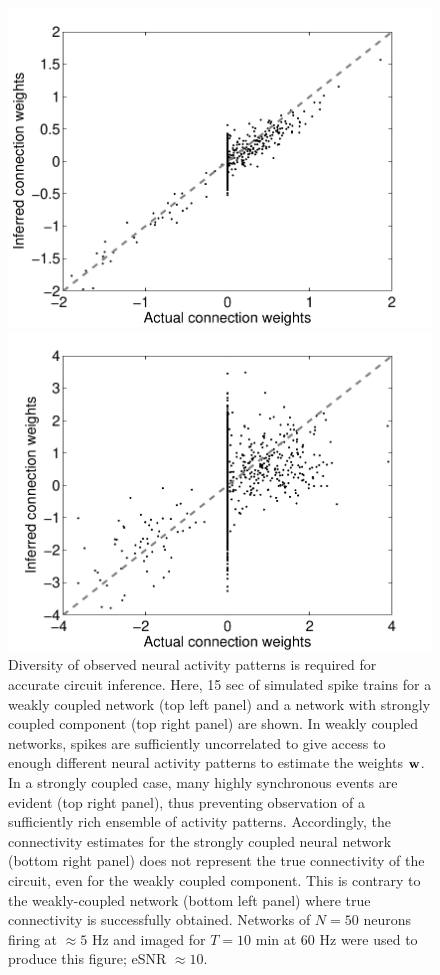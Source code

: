 \documentclass[aoas,preprint]{imsart}
\begin{document}
\begin{figure}[t!]
\begin{minipage}[c]{0.45\hsize}
\includegraphics[width=\hsize]{../figs/FigureA8_weak_corr}
\end{minipage}
\begin{minipage}[c]{0.45\hsize}
\includegraphics[width=\hsize]{../figs/FigureA8_strong_corr}
\end{minipage}
\caption{Diversity of observed neural activity patterns is required
for accurate circuit inference. Here, 15 sec of simulated spike trains
for a weakly coupled network (top left panel) and a network with
strongly coupled component (top right panel) are shown. In weakly
coupled networks, spikes are sufficiently uncorrelated to give access
to enough different neural activity patterns to estimate the weights
${\bf w}$. In a strongly coupled case, many highly synchronous events
are evident (top right panel), thus preventing observation of a
sufficiently rich ensemble of activity patterns. Accordingly, the
connectivity estimates for the strongly coupled neural network (bottom
right panel) does not represent the true connectivity of the circuit,
even for the weakly coupled component. This is contrary to the
weakly-coupled network (bottom left panel) where true connectivity is
successfully obtained. Networks of $N=50$ neurons firing at $\approx
5$ Hz and imaged for $T=10$ min at $60$ Hz were used to produce this
figure; eSNR $\approx 10$.}
\label{fig:rasters}
\end{figure}
\end{document}
